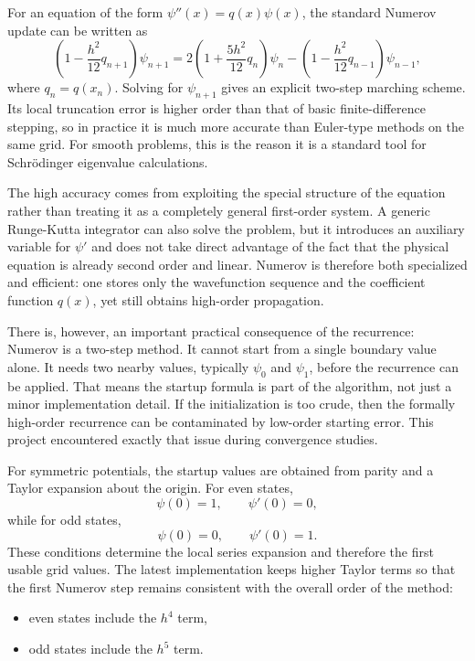 \documentclass[11pt]{article}
\begin{document}
    For an equation of the form $\psi''(x)=q(x)\psi(x)$, the standard Numerov update can be written as
    \begin{equation}
        \left(1-\frac{h^2}{12}q_{n+1}\right)\psi_{n+1}
        =
        2\left(1+\frac{5h^2}{12}q_n\right)\psi_n
        -
        \left(1-\frac{h^2}{12}q_{n-1}\right)\psi_{n-1},
    \end{equation}
    where $q_n=q(x_n)$. Solving for $\psi_{n+1}$ gives an explicit two-step marching scheme. Its local truncation error is higher order than that of basic finite-difference stepping, so in practice it is much more accurate than Euler-type methods on the same grid. For smooth problems, this is the reason it is a standard tool for Schr\"odinger eigenvalue calculations.

    The high accuracy comes from exploiting the special structure of the equation rather than treating it as a completely general first-order system. A generic Runge-Kutta integrator can also solve the problem, but it introduces an auxiliary variable for $\psi'$ and does not take direct advantage of the fact that the physical equation is already second order and linear. Numerov is therefore both specialized and efficient: one stores only the wavefunction sequence and the coefficient function $q(x)$, yet still obtains high-order propagation.

    There is, however, an important practical consequence of the recurrence: Numerov is a two-step method. It cannot start from a single boundary value alone. It needs two nearby values, typically $\psi_0$ and $\psi_1$, before the recurrence can be applied. That means the startup formula is part of the algorithm, not just a minor implementation detail. If the initialization is too crude, then the formally high-order recurrence can be contaminated by low-order starting error. This project encountered exactly that issue during convergence studies.

    For symmetric potentials, the startup values are obtained from parity and a Taylor expansion about the origin. For even states,
    \begin{equation}
        \psi(0)=1, \qquad \psi'(0)=0,
    \end{equation}
    while for odd states,
    \begin{equation}
        \psi(0)=0, \qquad \psi'(0)=1.
    \end{equation}
    These conditions determine the local series expansion and therefore the first usable grid values. The latest implementation keeps higher Taylor terms so that the first Numerov step remains consistent with the overall order of the method:
    \begin{itemize}
        \item even states include the $h^4$ term,
        \item odd states include the $h^5$ term.
    \end{itemize}
\end{document}
